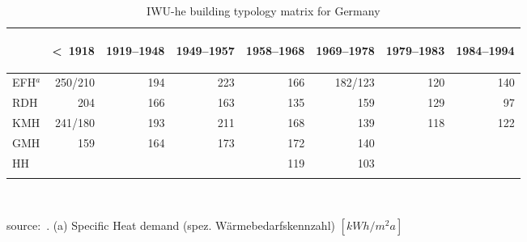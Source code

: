 \begin{table}[htbp]
  \centering
  \caption{IWU-he building typology matrix for Germany}\label{tab:IWU-he}%
    \begin{tabular}{l r rrr rrr}
    \addlinespace
    \toprule
    &
    \begin{sideways}\textless~1918	\end{sideways}&  
    \begin{sideways}1919--1948   \end{sideways}&  
    \begin{sideways}1949--1957   \end{sideways}&  
    \begin{sideways}1958--1968   \end{sideways}&  
    \begin{sideways}1969--1978   \end{sideways}&  
    \begin{sideways}1979--1983   \end{sideways}&  
    \begin{sideways}1984--1994   \end{sideways}\\
    \midrule
EFH$^a$ &250/210&194&223&166&182/123&120&140 \\
RDH     &204    &166&163&135    &159&129&97  \\
KMH     &241/180&193&211&168    &139&118&122 \\
GMH     &159    &164&173&172    &140&   &    \\ 
HH      &       &   &   &119    &103&   &    \\ 
    \bottomrule
    \addlinespace
    \end{tabular}\\
    \begin{footnotesize}    
    source:~\cite{Born.2003}.
    (a) Specific Heat demand (spez. W\"armebedarfskennzahl)
    $[kWh/m^{2}a]$\\
    
    \end{footnotesize}
\end{table}